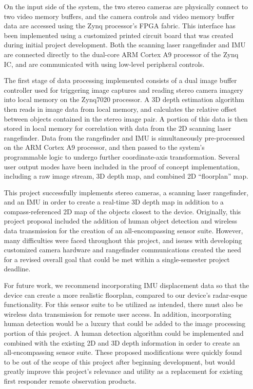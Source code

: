 \par
On the input side of the system, the two stereo cameras are physically connect to two video memory buffers, and the camera controls and video memory buffer data are accessed using the Zynq processor’s FPGA fabric. This interface has been implemented using a customized printed circuit board that was created during initial project development. Both the scanning laser rangefinder and IMU are connected directly to the dual-core ARM Cortex A9 processor of the Zynq IC, and are communicated with using low-level peripheral controls. 
\par
The first stage of data processing implemented consists of a dual image buffer controller used for triggering image captures and reading stereo camera imagery into local memory on the Zynq7020 processor. A 3D depth estimation algorithm then reads in image data from local memory, and calculates the relative offset between objects contained in the stereo image pair. A portion of this data is then stored in local memory for correlation with data from the 2D scanning laser rangefinder. Data from the rangefinder and IMU is simultaneously pre-processed on the ARM Cortex A9 processor, and then passed to the system’s programmable logic to undergo further coordinate-axis transformation. Several user output modes have been included in the proof of concept implementation, including a raw image stream, 3D depth map, and combined 2D “floorplan” map.  
\par
This project successfully implements stereo cameras, a scanning laser rangefinder, and an IMU in order to create a real-time 3D depth map in addition to a compass-referenced 2D map of the objects closest to the device. Originally, this project proposal included the addition of human object detection and wireless data transmission for the creation of an all-encompassing sensor suite. However, many difficulties were faced throughout this project, and issues with developing customized camera hardware and rangefinder communications created the need for a revised overall goal that could be met within a single-semester project deadline.
\par
For future work, we recommend incorporating IMU displacement data so that the device can create a more realistic floorplan, compared to our device’s radar-esque functionality. For this sensor suite to be utilized as intended, there must also be wireless data transmission for remote user access. In addition, incorporating human detection would be a luxury that could be added to the image processing portion of this project. A human detection algorithm could be implemented and combined with the existing 2D and 3D depth information in order to create an all-encompassing sensor suite. These proposed modifications were quickly found to be out of the scope of this project after beginning development, but would greatly improve this project’s relevance and utility as a replacement for existing first responder remote observation products.
